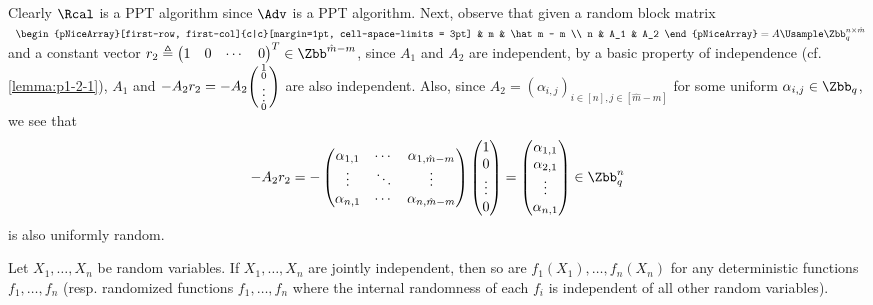 \begin{answer}[ii]
    Clearly $\Rcal$ is a PPT algorithm since $\Adv$ is a PPT algorithm. Next, observe that given a random block matrix $\;\;
    \begin{pNiceArray}[first-row, first-col]{c|c}[margin=1pt, cell-space-limits = 3pt]
                & m & \hat m - m \\
            n   & A_1 & A_2
    \end{pNiceArray}
    = A \Usample \Zbb_q^{n\times \hat m}$ and a constant vector $r_2\triangleq \begin{pmatrix}1 & 0 & \cdots & 0\end{pmatrix}^T \in \Zbb^{\hat m-m}$, since $A_1$ and $A_2$ are independent, by a basic property of independence (cf. \autoref{lemma:p1-2-1}), $A_1$ and $-A_2 r_2=-A_2\begin{psmallmatrix}1\\0\\\vdots\\0\end{psmallmatrix}$ are also independent. Also, since $A_2=\left(\alpha_{i, j}\right)_{i\in [n],j\in [\hat m-m]}$ for some uniform $\alpha_{i,j}\in\Zbb_q$, we see that
    \[
        -A_2r_2=-\begin{pmatrix}
            \alpha_{1, 1} &\cdots & \alpha_{1, \hat m-m}\\
            \vdots & \ddots & \vdots \\
            \alpha_{n, 1} &\cdots & \alpha_{n, \hat m -m}
        \end{pmatrix}\begin{pmatrix}1\\0\\\vdots\\0\end{pmatrix}
        =\begin{pmatrix}
            \alpha_{1, 1}\\ \alpha_{2, 1} \\ \vdots \\ \alpha_{n, 1}
        \end{pmatrix}
        \in \Zbb_q^{n}
    \]
    is also uniformly random.

    \begin{lemma}\label{lemma:p1-2-1}
        Let $X_1,\ldots,X_n$ be random variables. If $X_1,\ldots,X_n$  are jointly independent, then so are $f_1(X_1),\ldots, f_n(X_n)$ for any deterministic functions $f_1,\ldots, f_n$ (resp. randomized functions $f_1,\ldots, f_n$ where the internal randomness of each $f_i$ is independent of all other random variables).
    \end{lemma}


\end{answer}
